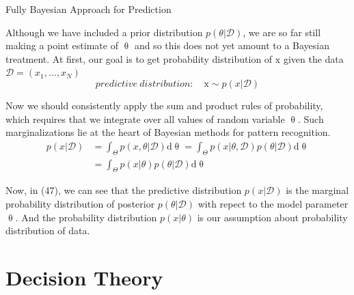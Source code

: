 \documentclass{bredelebeamer}
\begin{document}
\begin{frame}{Fully Bayesian Approach for Prediction}
  \begin{justify}
    Although we have included a prior distribution $p(\theta|\mathcal{D})$, we are
    so far still making a point estimate of $\uptheta$ and so this does not yet amount
    to a Bayesian treatment. At first, our goal is to get probability distribution
    of $\mathrm{x}$ given the data $\mathcal{D}=(x_1,\ldots,x_N)$
    \begin{equation}
      predictive\ distribution: \quad \mathrm{x} \sim p(x|\mathcal{D})
    \end{equation}

    Now we should consistently apply the sum and product rules of probability,
    which requires that we integrate over all values of random variable $\uptheta$.
    Such marginalizations lie at the heart of Bayesian methods for pattern recognition.
    \begin{equation}
      \begin{split}
        p(x|\mathcal{D})
        & = \int_\Theta p(x, \theta | \mathcal{D}) \mathrm{d}\uptheta
          = \int_\Theta p(x | \theta, \mathcal{D}) p(\theta|\mathcal{D}) \mathrm{d}\uptheta \\
        & = \int_\Theta p(x | \theta) p(\theta | \mathcal{D}) \mathrm{d}\uptheta
      \end{split}
    \end{equation}

    Now, in (47), we can see that the predictive distribution $p(x|\mathcal{D})$ is
    the marginal probability distribution of posterior $p(\theta | \mathcal{D})$
    with repect to the model parameter $\uptheta$. And the probability distribution
    $p(x | \theta)$ is our assumption about probability distribution of data.


  \end{justify}
\end{frame}


\section{Decision Theory}
\end{document}
